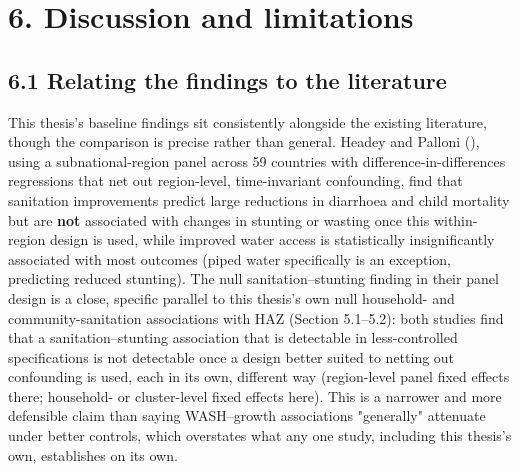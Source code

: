 \section*{6. Discussion and limitations}

\subsection*{6.1 Relating the findings to the literature}

This thesis's baseline findings sit consistently alongside the existing literature, though the comparison is precise rather than general. Headey and Palloni (\citeyear{HeadeyPalloni2019}), using a subnational-region panel across 59 countries with difference-in-differences regressions that net out region-level, time-invariant confounding, find that sanitation improvements predict large reductions in diarrhoea and child mortality but are \textbf{not} associated with changes in stunting or wasting once this within-region design is used, while improved water access is statistically insignificantly associated with most outcomes (piped water specifically is an exception, predicting reduced stunting). The null sanitation--stunting finding in their panel design is a close, specific parallel to this thesis's own null household- and community-sanitation associations with HAZ (Section 5.1--5.2): both studies find that a sanitation--stunting association that is detectable in less-controlled specifications is not detectable once a design better suited to netting out confounding is used, each in its own, different way (region-level panel fixed effects there; household- or cluster-level fixed effects here). This is a narrower and more defensible claim than saying WASH--growth associations "generally" attenuate under better controls, which overstates what any one study, including this thesis's own, establishes on its own.

